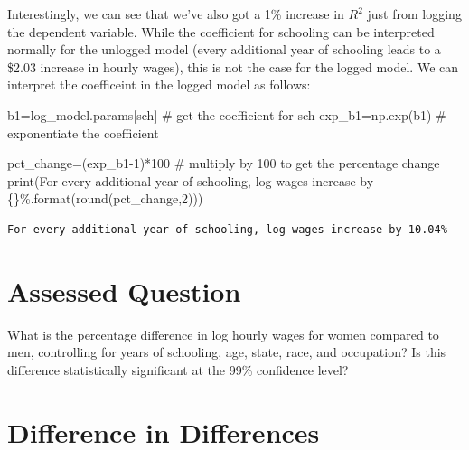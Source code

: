 \documentclass[
  letterpaper,
  DIV=11,
  numbers=noendperiod]{scrreprt}
\newenvironment{Shaded}{\begin{snugshade}}{\end{snugshade}}
\newcommand{\BuiltInTok}[1]{\textcolor[rgb]{0.00,0.23,0.31}{#1}}
\newcommand{\CommentTok}[1]{\textcolor[rgb]{0.37,0.37,0.37}{#1}}
\newcommand{\DecValTok}[1]{\textcolor[rgb]{0.68,0.00,0.00}{#1}}
\newcommand{\NormalTok}[1]{\textcolor[rgb]{0.00,0.23,0.31}{#1}}
\newcommand{\OperatorTok}[1]{\textcolor[rgb]{0.37,0.37,0.37}{#1}}
\newcommand{\SpecialCharTok}[1]{\textcolor[rgb]{0.37,0.37,0.37}{#1}}
\newcommand{\StringTok}[1]{\textcolor[rgb]{0.13,0.47,0.30}{#1}}
\begin{document}
Interestingly, we can see that we've also got a 1\% increase in \(R^2\)
just from logging the dependent variable. While the coefficient for
schooling can be interpreted normally for the unlogged model (every
additional year of schooling leads to a \$2.03 increase in hourly
wages), this is not the case for the logged model. We can interpret the
coefficeint in the logged model as follows:

\begin{Shaded}
\begin{Highlighting}[]
\NormalTok{b1}\OperatorTok{=}\NormalTok{log\_model.params[}\StringTok{\textquotesingle{}sch\textquotesingle{}}\NormalTok{] }\CommentTok{\# get the coefficient for sch}
\NormalTok{exp\_b1}\OperatorTok{=}\NormalTok{np.exp(b1) }\CommentTok{\# exponentiate the coefficient}

\NormalTok{pct\_change}\OperatorTok{=}\NormalTok{(exp\_b1}\OperatorTok{{-}}\DecValTok{1}\NormalTok{)}\OperatorTok{*}\DecValTok{100} \CommentTok{\# multiply by 100 to get the percentage change}
\BuiltInTok{print}\NormalTok{(}\StringTok{\textquotesingle{}For every additional year of schooling, log wages increase by }\SpecialCharTok{\{\}}\StringTok{\%\textquotesingle{}}\NormalTok{.}\BuiltInTok{format}\NormalTok{(}\BuiltInTok{round}\NormalTok{(pct\_change,}\DecValTok{2}\NormalTok{)))}
\end{Highlighting}
\end{Shaded}

\begin{verbatim}
For every additional year of schooling, log wages increase by 10.04%
\end{verbatim}


\hypertarget{assessed-question-6}{%
\chapter{Assessed Question}\label{assessed-question-6}}

What is the percentage difference in log hourly wages for women compared
to men, controlling for years of schooling, age, state, race, and
occupation? Is this difference statistically significant at the 99\%
confidence level?


\hypertarget{difference-in-differences}{%
\chapter{Difference in Differences}\label{difference-in-differences}}
\end{document}
